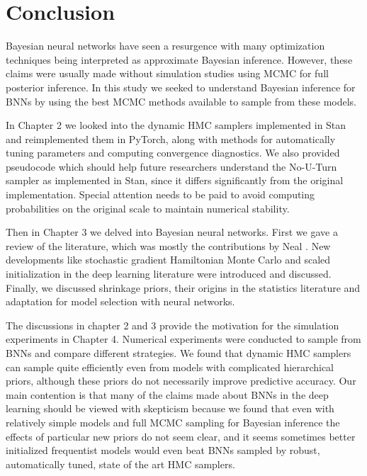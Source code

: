 \documentclass[12pt]{report}
\begin{document}
\section{Conclusion}

	Bayesian neural networks have seen a resurgence with many optimization techniques being interpreted as approximate Bayesian inference. However, these claims were usually made without simulation studies using MCMC for full posterior inference. In this study we seeked to understand Bayesian inference for BNNs by using the best MCMC methods available to sample from these models. 


In Chapter 2 we looked into the dynamic HMC samplers implemented in Stan and reimplemented them in PyTorch, along with methods for automatically tuning parameters and computing convergence diagnostics. We also provided pseudocode which should help future researchers understand the No-U-Turn sampler as implemented in Stan, since it differs significantly from the original implementation. Special attention needs to be paid to avoid computing probabilities on the original scale to maintain numerical stability.

Then in Chapter 3 we delved into Bayesian neural networks. First we gave a review of the literature, which was mostly the contributions by Neal \cite{neal1993bayesian}. New developments like stochastic gradient Hamiltonian Monte Carlo and scaled initialization in the deep learning literature \cite{chen2014stochastic,bengio1994learning} were introduced and discussed. Finally, we discussed shrinkage priors, their origins in the statistics literature and adaptation for model selection with neural networks. 

The discussions in chapter 2 and 3 provide the motivation for the simulation experiments in Chapter 4. Numerical experiments were conducted to sample from BNNs and compare different strategies. We found that dynamic HMC samplers can sample quite efficiently even from models with complicated hierarchical priors, although these priors do not necessarily improve predictive accuracy. Our main contention is that many of the claims made about BNNs in the deep learning should be viewed with skepticism because we found that even with relatively simple models and full MCMC sampling for Bayesian inference the effects of particular new priors do not seem clear, and it seems sometimes better initialized frequentist models would even beat BNNs sampled by robust, automatically tuned, state of the art HMC samplers.




\end{document}
